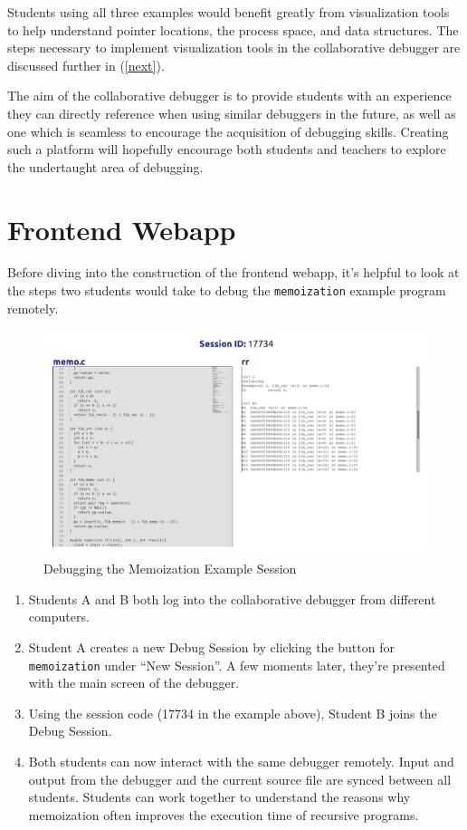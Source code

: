 \documentclass[12pt]{article}
\begin{document}
Students using all three examples would benefit greatly from
visualization tools to help understand pointer locations, the process
space, and data structures.  The steps necessary to implement
visualization tools in the collaborative debugger are discussed
further in (\ref{next}).
\par 

The aim of the collaborative debugger is to provide students with an
experience they can directly reference when using similar debuggers in
the future, as well as one which is seamless to encourage the
acquisition of debugging skills.  Creating such a platform will
hopefully encourage both students and teachers to explore the
undertaught area of debugging.

\section{Frontend Webapp}\label{webapp}

Before diving into the construction of the frontend webapp, it's
helpful to look at the steps two students would take to debug the
\lstinline{memoization} example program remotely.

\begin{figure}[h!]

  \includegraphics[width=\textwidth]{memoization}
  \centering
  \caption{Debugging the Memoization Example Session}
  \label{debugger:overview}
\end{figure}

\begin{enumerate}
\item Students A and B both log into the collaborative debugger from
  different computers.
\item Student A creates a new Debug Session by clicking the button for
  \lstinline{memoization} under ``New Session''.  A few moments later,
  they're presented with the main screen of the debugger.
\item Using the session code (17734 in the example above), Student B
  joins the Debug Session.
\item Both students can now interact with the same debugger remotely.
  Input and output from the debugger and the current source file are
  synced between all students.  Students can work together to
  understand the reasons why memoization often improves the execution
  time of recursive programs.
\end{enumerate}
\end{document}
